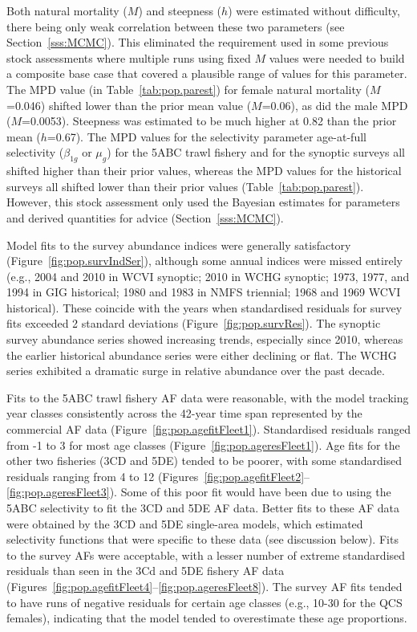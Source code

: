 \documentclass[11pt]{book}
\begin{document}
Both natural mortality ($M$) and steepness ($h$) were estimated without difficulty, there being only weak correlation between these two parameters (see Section~\ref{sss:MCMC}). 
This eliminated the requirement used in some previous stock assessments where multiple runs using fixed $M$ values were needed to build a composite base case that covered a plausible range of values for this parameter. 
The MPD value (in Table~\ref{tab:pop.parest}) for female natural mortality ($M$=0.046) shifted lower than the prior mean value ($M$=0.06), as did the male MPD ($M$=0.0053). 
Steepness was estimated to be much higher at 0.82 than the prior mean ($h$=0.67).
The MPD values for the selectivity parameter age-at-full selectivity ($\beta_{1g}$ or $\mu_g$) for the 5ABC trawl fishery and for the synoptic surveys all shifted higher than their prior values, whereas the MPD values for the historical surveys all shifted lower than their prior values (Table~\ref{tab:pop.parest}).
However, this stock assessment only used the Bayesian estimates for parameters and derived quantities for advice (Section~\ref{sss:MCMC}).

Model fits to the survey abundance indices were generally satisfactory (Figure~\ref{fig:pop.survIndSer}), although some annual indices were missed entirely (e.g., 2004 and 2010 in WCVI synoptic; 2010 in WCHG synoptic; 1973, 1977, and 1994 in GIG historical; 1980 and 1983 in NMFS triennial; 1968 and 1969 WCVI historical).
These coincide with the years when standardised residuals for survey fits exceeded 2 standard deviations (Figure~\ref{fig:pop.survRes}).
The synoptic survey abundance series showed increasing trends, especially since 2010, whereas the earlier historical abundance series were either declining or flat.
The WCHG series exhibited a dramatic surge in relative abundance over the past decade.

Fits to the 5ABC trawl fishery AF data were reasonable, with the model tracking year classes consistently across the 42-year time span represented by the commercial AF data (Figure~\ref{fig:pop.agefitFleet1}).
Standardised residuals ranged from -1 to 3 for most age classes (Figure~\ref{fig:pop.ageresFleet1}).
Age fits for the other two fisheries (3CD and 5DE) tended to be poorer, with some standardised residuals ranging from 4 to 12 (Figures~\ref{fig:pop.agefitFleet2}--\ref{fig:pop.ageresFleet3}).
Some of this poor fit would have been due to using the 5ABC selectivity to fit the 3CD and 5DE AF data. 
Better fits to these AF data were obtained by the 3CD and 5DE single-area models, which estimated selectivity functions that were specific to these data (see discussion below).
Fits to the survey AFs were acceptable, with a lesser number of extreme standardised residuals than seen in the 3Cd and 5DE fishery AF data (Figures~\ref{fig:pop.agefitFleet4}--\ref{fig:pop.ageresFleet8}).
The survey AF fits tended to have runs of negative residuals for certain age classes (e.g., 10-30 for the QCS females), indicating that the model tended to overestimate these age proportions.
\end{document}

